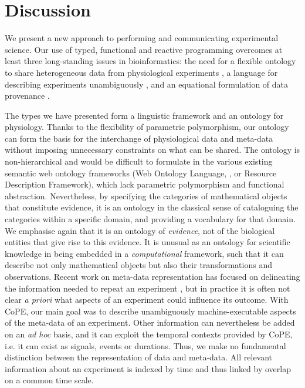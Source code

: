 \section*{Discussion}

We present a new approach to performing and communicating
experimental science.  Our use of
typed, functional and reactive programming overcomes at least three
long-standing issues in bioinformatics: the need for a flexible
ontology to share heterogeneous data from physiological experiments
\citep{Amari2002}, a language for describing experiments unambiguously
\citep{Murray-Rust2002}, and an equational formulation of data
provenance \citep{Pool2002}. 

The types we have presented form a linguistic framework and an
ontology for physiology. Thanks to the flexibility of parametric
polymorphism, our ontology can form the basis for the interchange of
physiological data and meta-data without imposing unnecessary
constraints on what can be shared. The ontology is non-hierarchical
and would be difficult to formulate in the various existing semantic
web ontology frameworks (Web Ontology Language, \citep{owlref}, or
Resource Description Framework), which lack parametric polymorphism
and functional abstraction. Nevertheless, by specifying the categories
of mathematical objects that constitute evidence, it is an ontology in
the classical sense of cataloguing the categories within a specific
domain, and providing a vocabulary for that domain. We emphasise again
that it is an ontology of \emph{evidence}, not of the biological
entities that give rise to this evidence. It is unusual as an ontology
for scientific knowledge in being embedded in a \emph{computational}
framework, such that it can describe not only mathematical objects but
also their transformations and observations. Recent work on meta-data
representation \citep{Bower2009} has focused on delineating the
information needed to repeat an experiment \citep{Taylor2007,
  Gibson2008}, but in practice it is often not clear \emph{a priori} what
aspects of an experiment could influence its outcome. With CoPE, our main goal was to 
describe unambiguously machine-executable aspects of the meta-data of an
experiment. Other information can nevertheless be 
added on an \emph{ad hoc} basis, and it can exploit the temporal contexts
provided by CoPE, i.e. it can exist as signals, events or durations. Thus, we
make no fundamental distinction between the representation of data and
meta-data. All relevant information about an experiment is indexed by
time and thus linked by overlap on a common time scale.

